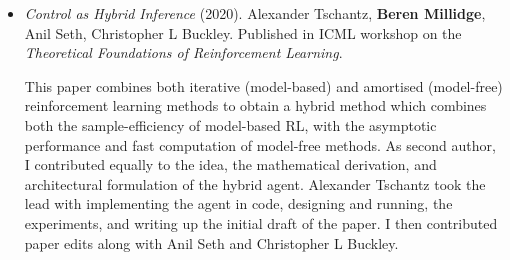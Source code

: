 \begin{itemize}
\item \emph{Control as Hybrid Inference} (2020). Alexander Tschantz, \textbf{Beren Millidge}, Anil Seth, Christopher L Buckley. Published in ICML workshop on the \emph{Theoretical Foundations of Reinforcement Learning}. \newline 

This paper combines both iterative (model-based) and amortised (model-free) reinforcement learning methods to obtain a hybrid method which combines both the sample-efficiency of model-based RL, with the asymptotic performance and fast computation of model-free methods. As second author, I contributed equally to the idea, the mathematical derivation, and architectural formulation of the hybrid agent. Alexander Tschantz took the lead with implementing the agent in code, designing and running, the experiments, and writing up the initial draft of the paper. I then contributed paper edits along with Anil Seth and Christopher L Buckley.
\end{itemize}

